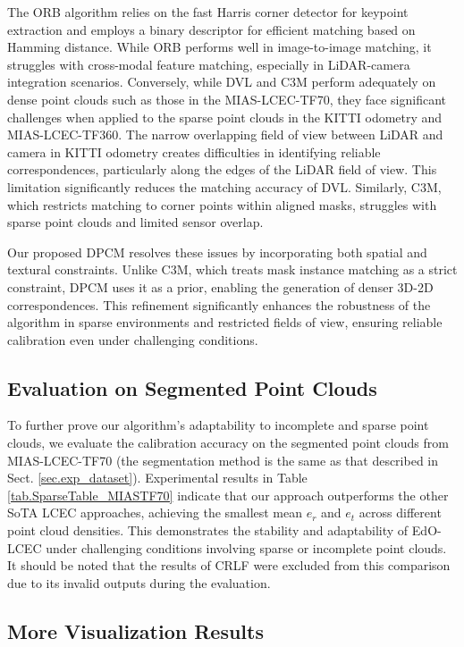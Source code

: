 The ORB algorithm relies on the fast Harris corner detector for keypoint extraction and employs a binary descriptor for efficient matching based on Hamming distance. While ORB performs well in image-to-image matching, it struggles with cross-modal feature matching, especially in LiDAR-camera integration scenarios. Conversely, while DVL and C3M perform adequately on dense point clouds such as those in the MIAS-LCEC-TF70, they face significant challenges when applied to the sparse point clouds in the KITTI odometry and MIAS-LCEC-TF360. The narrow overlapping field of view between LiDAR and camera in KITTI odometry creates difficulties in identifying reliable correspondences, particularly along the edges of the LiDAR field of view. This limitation significantly reduces the matching accuracy of DVL. Similarly, C3M, which restricts matching to corner points within aligned masks, struggles with sparse point clouds and limited sensor overlap.

Our proposed DPCM resolves these issues by incorporating both spatial and textural constraints. Unlike C3M, which treats mask instance matching as a strict constraint, DPCM uses it as a prior, enabling the generation of denser 3D-2D correspondences. This refinement significantly enhances the robustness of the algorithm in sparse environments and restricted fields of view, ensuring reliable calibration even under challenging conditions.

\subsection{Evaluation on Segmented Point Clouds}
\label{sec.add_eva_seg_pointcloud}
To further prove our algorithm's adaptability to incomplete and sparse point clouds, we evaluate the calibration accuracy on the segmented point clouds from MIAS-LCEC-TF70 (the segmentation method is the same as that described in Sect. \ref{sec.exp_dataset}). 
Experimental results in Table \ref{tab.SparseTable_MIASTF70} indicate that our approach outperforms the other SoTA LCEC approaches, achieving the smallest mean $e_r$ and $e_t$ across different point cloud densities. This demonstrates the stability and adaptability of EdO-LCEC under challenging conditions involving sparse or incomplete point clouds. It should be noted that the results of CRLF were excluded from this comparison due to its invalid outputs during the evaluation. 

\subsection{More Visualization Results}
\label{sec.more_visualization}

